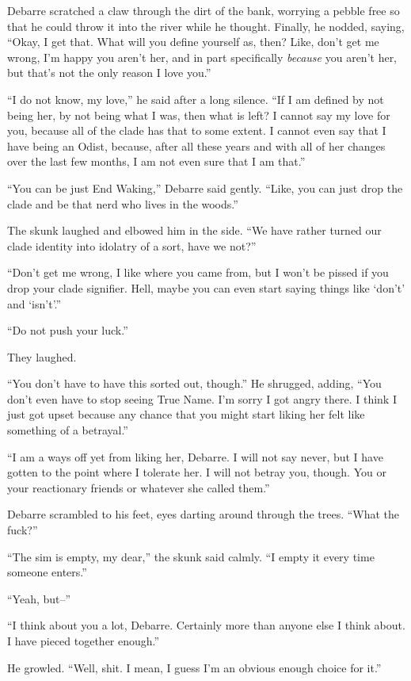 Debarre scratched a claw through the dirt of the bank, worrying a pebble free so that he could throw it into the river while he thought. Finally, he nodded, saying, ``Okay, I get that. What will you define yourself as, then? Like, don't get me wrong, I'm happy you aren't her, and in part specifically \emph{because} you aren't her, but that's not the only reason I love you.''

``I do not know, my love,'' he said after a long silence. ``If I am defined by not being her, by not being what I was, then what is left? I cannot say my love for you, because all of the clade has that to some extent. I cannot even say that I have being an Odist, because, after all these years and with all of her changes over the last few months, I am not even sure that I am that.''

``You can be just End Waking,'' Debarre said gently. ``Like, you can just drop the clade and be that nerd who lives in the woods.''

The skunk laughed and elbowed him in the side. ``We have rather turned our clade identity into idolatry of a sort, have we not?''

``Don't get me wrong, I like where you came from, but I won't be pissed if you drop your clade signifier. Hell, maybe you can even start saying things like `don't' and `isn't'.''

``Do not push your luck.''

They laughed.

``You don't have to have this sorted out, though.'' He shrugged, adding, ``You don't even have to stop seeing True Name. I'm sorry I got angry there. I think I just got upset because any chance that you might start liking her felt like something of a betrayal.''

``I am a ways off yet from liking her, Debarre. I will not say never, but I have gotten to the point where I tolerate her. I will not betray you, though. You or your reactionary friends or whatever she called them.''

Debarre scrambled to his feet, eyes darting around through the trees. ``What the fuck?''

``The sim is empty, my dear,'' the skunk said calmly. ``I empty it every time someone enters.''

``Yeah, but--''

``I think about you a lot, Debarre. Certainly more than anyone else I think about. I have pieced together enough.''

He growled. ``Well, shit. I mean, I guess I'm an obvious enough choice for it.''

